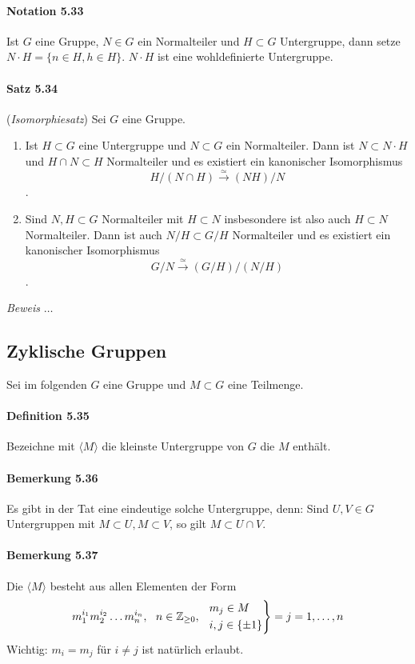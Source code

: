 \documentclass{scrartcl}
\begin{document}
\paragraph{Notation 5.33} Ist $G$ eine Gruppe, $N \in G$ ein Normalteiler und $H
\subset G$ Untergruppe, dann setze $N \cdot H = \{n \in H, h \in H\}$. $N \cdot
H$ ist eine wohldefinierte Untergruppe.

\paragraph{Satz 5.34} (\textit{Isomorphiesatz}) Sei $G$ eine Gruppe.
\begin{enumerate}
\item Ist $H \subset G$ eine Untergruppe und $N \subset G$ ein Normalteiler.
  Dann ist $N \subset N \cdot H$ und $H \cap N \subset H$ Normalteiler und es
  existiert ein kanonischer Isomorphismus
  \[
    H/(N \cap H) \overset{\simeq}{\to} (NH)/N
  \]
  .
\item Sind $N, H \subset G$ Normalteiler mit $H \subset N$ insbesondere ist also
  auch $H \subset N$ Normalteiler. Dann ist auch $N/H \subset G/H$ Normalteiler
  und es existiert ein kanonischer Isomorphismus
  \[
    G/N \overset{\simeq}{\to}(G/H)/(N/H)
  \]
  .
\end{enumerate}
\textit{Beweis} $\dots$

\subsection{Zyklische Gruppen}
\label{subsec:zyklischegruppen}

Sei im folgenden $G$ eine Gruppe und $M \subset G$ eine Teilmenge.

\paragraph{Definition 5.35}
Bezeichne mit $\langle M \rangle$ die kleinste Untergruppe von $G$ die $M$
enthält.

\paragraph{Bemerkung 5.36}
Es gibt in der Tat eine eindeutige solche Untergruppe, denn: Sind $U,V \in G$
Untergruppen mit $M \subset U, M \subset V$,  so gilt $M \subset U \cap V$.

\paragraph{Bemerkung 5.37}
Die $\langle M \rangle$ besteht aus allen Elementen der Form
\[
  m_1^{i_1}m_2^{i_2} \dots m_n^{i_n} ,~~ n \in \mathbb{Z}_{\geq
    0},~~
  \begin{rcases}
    m_j \in M \\
    i,j \in \{\pm 1\}
  \end{rcases} = j = 1, \dots, n
\]
Wichtig: $m_i = m_j$ für $i \neq j$ ist natürlich erlaubt.
\end{document}
